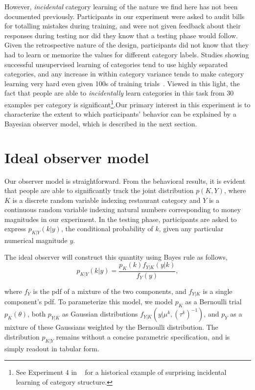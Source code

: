 \documentclass[10pt,letterpaper]{article}
\begin{document}
However, {\em incidental} category learning of the nature we find here has not been documented previously. Participants in our experiment were asked to audit bills for totalling mistakes during training, and were not given feedback about their responses during testing nor did they know that a testing phase would follow. Given the retrospective nature of the design, participants did not know that they had to learn or memorize the values for different category labels. Studies showing successful unsupervised learning of categories tend to use highly separated categories, and any increase in within category variance tends to make category learning very hard even given 100s of training trials~\cite{ell2012impact}. Viewed in this light, the fact that people are able to {\em incidentally} learn categories in this task from 30 examples per category is significant\footnote{See Experiment 4 in ~ for a historical example of surprising incidental learning of category structure.}.Our primary interest in this experiment is to characterize the extent to which participants' behavior can be explained by a Bayesian observer model, which is described in the next section. 

\section{Ideal observer model}

Our observer model is straightforward. From the behavioral results, it is evident that people are able to significantly track the joint distribution $p(K,Y)$, where $K$ is a discrete random variable indexing restaurant category and $Y$ is a continuous random variable indexing natural numbers corresponding to money magnitudes in our experiment. In the testing phase, participants are asked to express $p_{K|Y}(k|y)$, the conditional probability of $k$, given any particular numerical magnitude $y$.  

The ideal observer will construct this quantity using Bayes rule as follows,
\begin{equation}
    p_{K|Y}(k|y) = \frac{p_K(k)f_{Y|K}(y|k)}{f_Y(y)},
    \label{eqn:main}
\end{equation}

where $f_Y$ is the pdf of a mixture of the two components, and $f_{Y|K}$ is a single component's pdf. To parameterize this model, we model $p_K$ as a Bernoulli trial $p_K(\theta)$, both $p_{Y|K}$ as Gaussian distributions $f_{Y|K}(y|\mu^k, (\tau^k)^{-1})$, and $p_Y$ as a mixture of these Gaussians weighted by the Bernoulli distribution. The distribution $p_{K|Y}$ remains without a concise parametric specification, and is simply readout in tabular form. 
\end{document}
